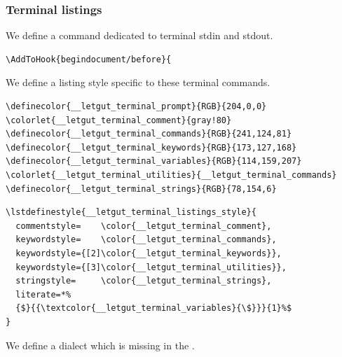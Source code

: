 \documentclass{letgut}
\begin{document}
\subsubsection{Terminal listings}
\label{sec:org14731c9}

We define a command dedicated to terminal stdin and stdout.

\begin{lstlisting}
\AddToHook{begindocument/before}{
\end{lstlisting}

We define a listing style specific to these terminal commands.

\begin{lstlisting}
\definecolor{__letgut_terminal_prompt}{RGB}{204,0,0}
\colorlet{__letgut_terminal_comment}{gray!80}
\definecolor{__letgut_terminal_commands}{RGB}{241,124,81}
\definecolor{__letgut_terminal_keywords}{RGB}{173,127,168}
\definecolor{__letgut_terminal_variables}{RGB}{114,159,207}
\colorlet{__letgut_terminal_utilities}{__letgut_terminal_commands}
\definecolor{__letgut_terminal_strings}{RGB}{78,154,6}
\end{lstlisting}

\begin{lstlisting}
\lstdefinestyle{__letgut_terminal_listings_style}{
  commentstyle=    \color{__letgut_terminal_comment},
  keywordstyle=    \color{__letgut_terminal_commands},
  keywordstyle={[2]\color{__letgut_terminal_keywords}},
  keywordstyle={[3]\color{__letgut_terminal_utilities}},
  stringstyle=     \color{__letgut_terminal_strings},
  literate=*%
  {$}{{\textcolor{__letgut_terminal_variables}{\$}}}{1}%$
}
\end{lstlisting}

We define a dialect which is missing in the .
\end{document}

